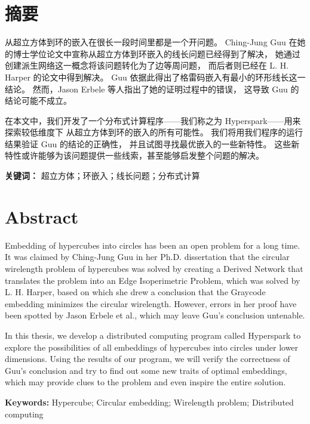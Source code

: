 
\chapter*{摘要}
\label{Abstract CN}

从超立方体到环的嵌入在很长一段时间里都是一个开问题。
Ching-Jung Guu 在她的博士学位论文中宣称从超立方体到环嵌入的线长问题已经得到了解决，
她通过创建派生网络这一概念将该问题转化为了边等周问题，
而后者则已经在 L. H. Harper 的论文中得到解决。
Guu 依据此得出了格雷码嵌入有最小的环形线长这一结论。
然而，Jason Erbele 等人指出了她的证明过程中的错误，
这导致 Guu 的结论可能不成立。

在本文中，我们开发了一个分布式计算程序——我们称之为 Hyperspark——用来探索较低维度下
从超立方体到环的嵌入的所有可能性。
我们将用我们程序的运行结果验证 Guu 的结论的正确性，
并且试图寻找最优嵌入的一些新特性。
这些新特性或许能够为该问题提供一些线索，甚至能够启发整个问题的解决。
\hfill\break

\textbf{关键词：} 超立方体；环嵌入；线长问题；分布式计算

\chapter*{Abstract}
\label{Abstract EN}

Embedding of hypercubes into circles has been an open problem for a long time.
It was claimed by Ching-Jung Guu in her Ph.D. dissertation that
the circular wirelength problem of hypercubes was solved by creating a Derived
Network that translates the problem into an Edge Isoperimetric Problem,
which was solved by L. H. Harper, based on which
she drew a conclusion that the Graycode embedding minimizes the circular wirelength.
However, errors in her proof have been spotted by Jason Erbele et al.,
which may leave Guu's conclusion untenable.

In this thesis, we develop a distributed computing program called Hyperspark to
explore the possibilities of all embeddings of hypercubes into circles under lower dimensions.
Using the results of our program, we will verify the correctness of Guu's conclusion
and try to find out some new traits of optimal embeddings,
which may provide clues to the problem and even inspire the entire solution.
\hfill\break

\textbf{Keywords:} Hypercube; Circular embedding; Wirelength problem;
Distributed computing
